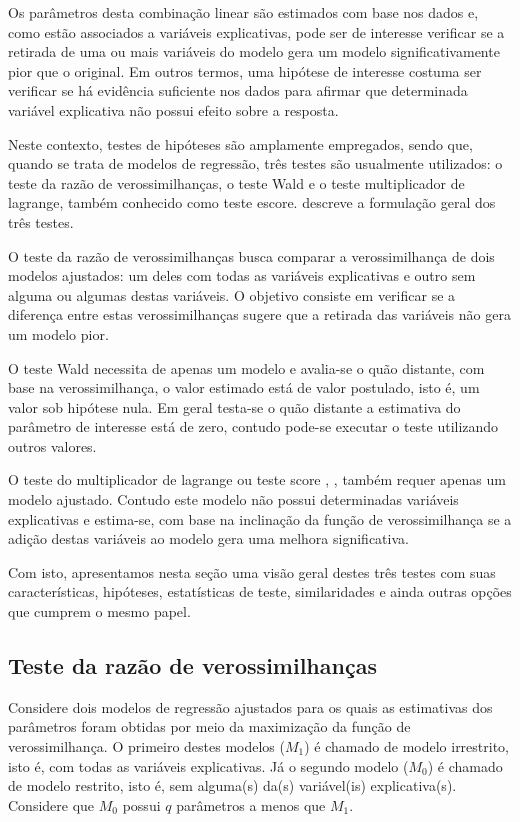 Os parâmetros desta combinação linear são estimados com base nos dados e, como estão associados a variáveis explicativas, pode ser de interesse verificar se a retirada de uma ou mais variáveis do modelo gera um modelo significativamente pior que o original. Em outros termos, uma hipótese de interesse costuma ser verificar se há evidência suficiente nos dados para afirmar que determinada variável explicativa não possui efeito sobre a resposta.

Neste contexto, testes de hipóteses são amplamente empregados, sendo que, quando se trata de modelos de regressão, três testes são usualmente utilizados: o teste da razão de verossimilhanças, o teste Wald e o teste multiplicador de lagrange, também conhecido como teste escore. \citet{engle} descreve a formulação geral dos três testes.

O teste da razão de verossimilhanças \citep{trv} busca comparar a  verossimilhança de dois modelos ajustados: um deles com todas as variáveis explicativas e outro sem alguma ou algumas destas variáveis. O objetivo consiste em verificar se a diferença entre estas verossimilhanças sugere que a retirada das variáveis não gera um modelo pior.

O teste Wald \citep{wald} necessita de apenas um modelo e avalia-se o quão distante, com base na verossimilhança, o valor estimado está de valor postulado, isto é, um valor sob hipótese nula. Em geral testa-se o quão distante a estimativa do parâmetro de interesse está de zero, contudo pode-se executar o teste utilizando outros valores.

O teste do multiplicador de lagrange ou teste score \citep{score1}, \citep{score2}, \citep{score3} também requer apenas um modelo ajustado. Contudo este modelo não possui determinadas variáveis explicativas e estima-se, com base na inclinação da função de verossimilhança se a adição destas variáveis ao modelo gera uma melhora significativa.

Com isto, apresentamos nesta seção uma visão geral destes três testes com suas características, hipóteses, estatísticas de teste, similaridades e ainda outras opções que cumprem o mesmo papel.

\subsection{Teste da razão de verossimilhanças}

Considere dois modelos de regressão ajustados para os quais as estimativas dos parâmetros foram obtidas por meio da maximização da função de verossimilhança. O primeiro destes modelos ($M_1$) é chamado de modelo irrestrito, isto é, com todas as variáveis explicativas. Já o segundo modelo ($M_0$) é chamado de modelo restrito, isto é, sem alguma(s) da(s) variável(is) explicativa(s). Considere que $M_0$ possui $q$ parâmetros a menos que $M_1$.

